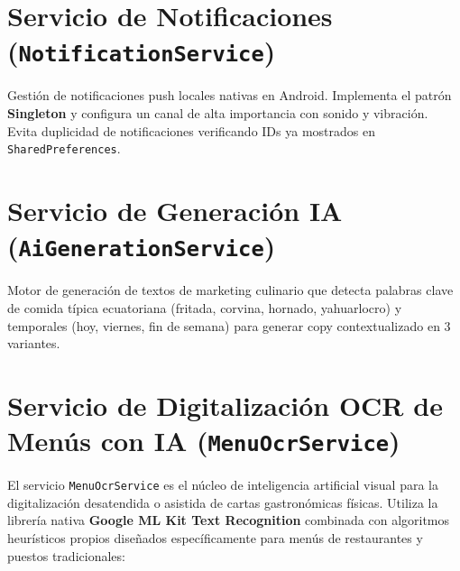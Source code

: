 \documentclass[11pt, a4paper, oneside]{report}
\begin{document}
\section{Servicio de Notificaciones (\texttt{NotificationService})}

Gestión de notificaciones push locales nativas en Android. Implementa el patrón \textbf{Singleton} y configura un canal de alta importancia con sonido y vibración. Evita duplicidad de notificaciones verificando IDs ya mostrados en \texttt{SharedPreferences}.

\section{Servicio de Generación IA (\texttt{AiGenerationService})}

Motor de generación de textos de marketing culinario que detecta palabras clave de comida típica ecuatoriana (fritada, corvina, hornado, yahuarlocro) y temporales (hoy, viernes, fin de semana) para generar copy contextualizado en 3 variantes.

\section{Servicio de Digitalización OCR de Menús con IA (\texttt{MenuOcrService})}

El servicio \texttt{MenuOcrService} es el núcleo de inteligencia artificial visual para la digitalización desatendida o asistida de cartas gastronómicas físicas. Utiliza la librería nativa \textbf{Google ML Kit Text Recognition} combinada con algoritmos heurísticos propios diseñados específicamente para menús de restaurantes y puestos tradicionales:
\end{document}
